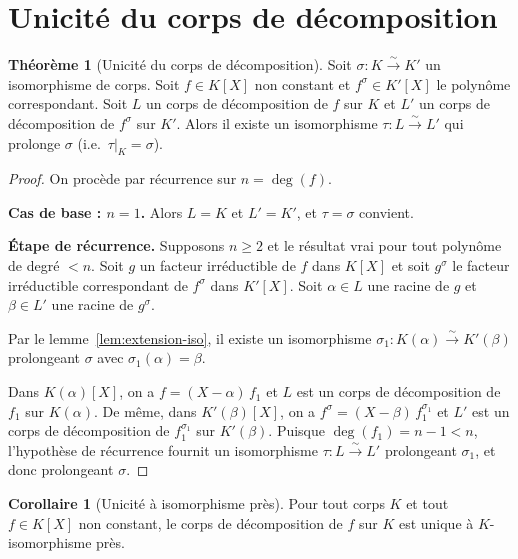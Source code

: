 \documentclass[12pt,a4paper,openany]{book}
\theoremstyle{definition}
\newtheorem{theoreme}{Théorème}[chapter]
\newtheorem{corollaire}{Corollaire}[chapter]
\renewcommand{\deg}{\operatorname{deg}}
\begin{document}
\section{Unicité du corps de décomposition}
\label{sec:unicite-decomp}

\begin{theoreme}[Unicité du corps de décomposition]\label{thm:unicite-decomp}
Soit $\sigma \colon K \xrightarrow{\sim} K'$ un isomorphisme de corps. Soit
$f \in K[X]$ non constant et $f^\sigma \in K'[X]$ le polynôme correspondant.
Soit $L$ un corps de décomposition de $f$ sur $K$ et $L'$ un corps de
décomposition de $f^\sigma$ sur $K'$. Alors il existe un isomorphisme
$\tau \colon L \xrightarrow{\sim} L'$ qui prolonge $\sigma$ (i.e.\
$\tau|_K = \sigma$).
\end{theoreme}

\begin{proof}
On procède par récurrence sur $n = \deg(f)$.

\textbf{Cas de base : $n = 1$.} Alors $L = K$ et $L' = K'$, et $\tau = \sigma$
convient.

\textbf{Étape de récurrence.} Supposons $n \geq 2$ et le résultat vrai pour
tout polynôme de degré $< n$. Soit $g$ un facteur irréductible de $f$ dans $K[X]$
et soit $g^\sigma$ le facteur irréductible correspondant de $f^\sigma$ dans
$K'[X]$. Soit $\alpha \in L$ une racine de $g$ et $\beta \in L'$ une racine
de $g^\sigma$.

Par le lemme~\ref{lem:extension-iso}, il existe un isomorphisme
$\sigma_1 \colon K(\alpha) \xrightarrow{\sim} K'(\beta)$ prolongeant $\sigma$
avec $\sigma_1(\alpha) = \beta$.

Dans $K(\alpha)[X]$, on a $f = (X - \alpha)\, f_1$ et $L$ est un corps de
décomposition de $f_1$ sur $K(\alpha)$. De même, dans $K'(\beta)[X]$, on a
$f^\sigma = (X - \beta)\, f_1^{\sigma_1}$ et $L'$ est un corps de décomposition
de $f_1^{\sigma_1}$ sur $K'(\beta)$. Puisque $\deg(f_1) = n - 1 < n$,
l'hypothèse de récurrence fournit un isomorphisme
$\tau \colon L \xrightarrow{\sim} L'$ prolongeant $\sigma_1$, et donc
prolongeant $\sigma$.
\end{proof}

\begin{corollaire}[Unicité à isomorphisme près]\label{cor:unicite-decomp}
Pour tout corps $K$ et tout $f \in K[X]$ non constant, le corps de décomposition
de $f$ sur $K$ est unique à $K$-isomorphisme près.
\end{corollaire}
\end{document}
